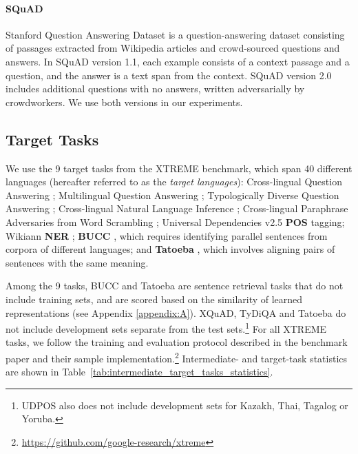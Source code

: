 \documentclass[11pt,a4paper]{article}
\begin{document}
\paragraph{SQuAD} Stanford Question Answering Dataset \citep{rajpurkar-etal-2016-squad,rajpurkar-etal-2018-know} is a question-answering dataset consisting of passages extracted from Wikipedia articles and crowd-sourced questions and answers. In SQuAD version 1.1, each example consists of a context passage and a question, and the answer is a text span from the context. SQuAD version 2.0 includes additional questions with no answers, written adversarially by crowdworkers. We use both versions in our experiments.

\subsection{Target Tasks}
\label{sec:target_tasks}

We use the 9 target tasks from the XTREME benchmark, which span 40 different languages (hereafter referred to as the \textit{target languages}): 
Cross-lingual Question Answering \citep[\textbf{XQuAD};][]{artetxe2019cross};
Multilingual Question Answering \citep[\textbf{MLQA};][]{lewis2019mlqa};
Typologically Diverse Question Answering \citep[\textbf{TyDiQA-GoldP};][]{tydiqa};
Cross-lingual Natural Language Inference \citep[\textbf{XNLI};][]{conneau-etal-2018-xnli};
Cross-lingual Paraphrase Adversaries from Word Scrambling  \citep[\textbf{PAWS-X};][]{yang-etal-2019-paws};
Universal Dependencies v2.5 \citep{nivre:hal-01930733} {\bf POS} tagging;
Wikiann {\bf NER} \cite{pan-etal-2017-cross};
\textbf{BUCC} \cite{zweigenbaum-etal-2017-overview,zweigenbaum-etal-2018-overview}, which requires identifying parallel sentences from corpora of different languages;
and \textbf{Tatoeba} \cite{artetxe2019massively}, which involves aligning pairs of sentences with the same meaning.

Among the 9 tasks, BUCC and Tatoeba are sentence retrieval tasks that do not include training sets, and are scored based on the similarity of learned representations (see Appendix \ref{appendix:A}). XQuAD, TyDiQA and Tatoeba do not include development sets separate from the test sets.\footnote{UDPOS also does not include development sets for Kazakh, Thai, Tagalog or Yoruba.} For all XTREME tasks, we follow the training and evaluation protocol described in the benchmark paper \citep{hu2020xtreme} and their sample implementation.\footnote{\url{https://github.com/google-research/xtreme}}
Intermediate- and target-task statistics are shown in Table~\ref{tab:intermediate_target_tasks_statistics}.
\end{document}
